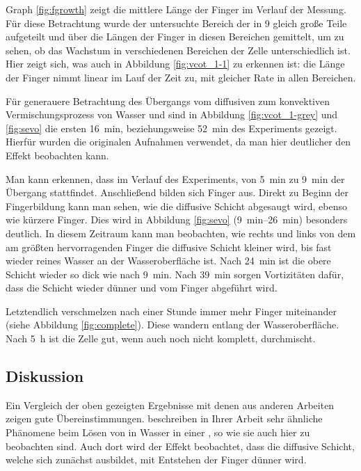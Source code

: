 Graph \ref{fig:fgrowth} zeigt die mittlere Länge der Finger im Verlauf der Messung. Für diese Betrachtung wurde der untersuchte Bereich der \HSC in 9 gleich große Teile aufgeteilt und über die Längen der Finger in diesen Bereichen gemittelt, um zu sehen, ob das Wachstum in verschiedenen Bereichen der Zelle unterschiedlich ist. 
Hier zeigt sich, was auch in Abbildung \ref{fig:vcot_1-1} zu erkennen ist: die Länge der Finger nimmt linear im Lauf der Zeit zu, mit gleicher Rate in allen Bereichen.

Für generauere Betrachtung des Übergangs vom diffusiven zum konvektiven Vermischungsprozess von Wasser und \COT sind in Abbildung \ref{fig:vcot_1-grey} und \ref{fig:sevo} die ersten \SI{16}{\minute}, beziehungsweise \SI{52}{\minute} des Experiments gezeigt. Hierfür wurden die originalen Aufnahmen verwendet, da man hier deutlicher den Effekt beobachten kann.

Man kann erkennen, dass im Verlauf des Experiments, von \SI{5}{\minute} zu \SI{9}{\minute} der Übergang stattfindet. Anschließend bilden sich Finger aus. Direkt zu Beginn der Fingerbildung kann man sehen, wie die diffusive Schicht abgesaugt wird, ebenso wie kürzere Finger. Dies wird in Abbildung \ref{fig:sevo} (\SIrange{9}{26}{\minute}) besonders deutlich. In diesem Zeitraum kann man beobachten, wie rechts und links von dem am größten hervorragenden Finger die diffusive Schicht kleiner wird, bis fast wieder reines Wasser an der Wasseroberfläche ist. Nach \SI{24}{\minute} ist die obere \COT Schicht wieder so dick wie nach \SI{9}{\minute}. Nach \SI{39}{\minute} sorgen Vortizitäten dafür, dass die Schicht wieder dünner und vom Finger abgeführt wird.

Letztendlich verschmelzen nach einer Stunde immer mehr Finger miteinander (siehe \zB Abbildung \ref{fig:complete}). Diese wandern entlang der Wasseroberfläche.
Nach \SI{5}{\hour} ist die Zelle gut, wenn auch noch nicht komplett, durchmischt.


\subsection{Diskussion}
\label{res:cot:disk}

Ein Vergleich der oben gezeigten Ergebnisse mit denen aus anderen Arbeiten zeigen gute Übereinstimmungen.
\cite{kneafsy} beschreiben in Ihrer Arbeit sehr ähnliche Phänomene beim Lösen von \COT in Wasser in einer \HSC, so wie sie auch hier zu beobachten sind. Auch dort wird der Effekt beobachtet, dass die diffusive Schicht, welche sich zunächst ausbildet, mit Entstehen der Finger dünner wird.

